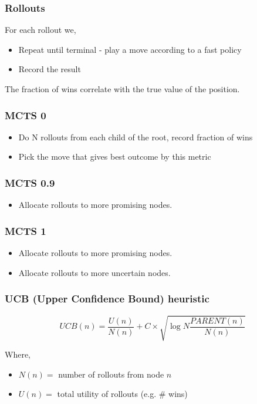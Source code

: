 \subsubsection{Rollouts}
For each rollout we, 
\begin{itemize}
    \item Repeat until terminal - play a move according to a fast policy
    \item Record the result
\end{itemize}

The fraction of wins correlate with the true value of the position.

\subsubsection{MCTS 0}
\begin{itemize}
    \item Do N rollouts from each child of the root, record fraction of wins
    \item Pick the move that gives best outcome by this metric 
\end{itemize}

\subsubsection{MCTS 0.9}
\begin{itemize}
    \item Allocate rollouts to more promising nodes.
\end{itemize}

\subsubsection{MCTS 1}
\begin{itemize}
    \item Allocate rollouts to more promising nodes.
    \item Allocate rollouts to more uncertain nodes.
\end{itemize}

\subsubsection{UCB (Upper Confidence Bound) heuristic}


$$ UCB(n) = \frac{U(n)}{N(n)} + C \times \sqrt{\log N \frac{PARENT(n)}{N(n)}} $$ 

Where, 
\begin{itemize}
    \item $N(n) = $ number of rollouts from node  $n$
    \item  $U(n) = $ total utility of rollouts (e.g. \# wins)
\end{itemize}

